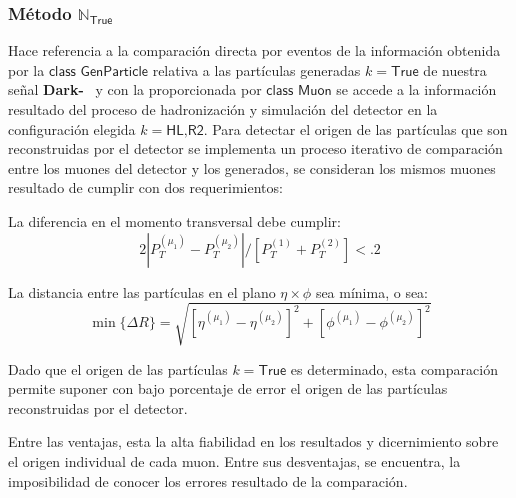 \subsubsection{Método $\mathbb{N}_\textsf{True}$}
Hace referencia a la comparación directa por eventos de la información obtenida por la  $\textsf{class GenParticle}$ relativa a las partículas generadas $k=\textsf{True}$ de nuestra señal \textbf{Dark-}\SUSY ~ y con la proporcionada por $\textsf{class Muon}$ se accede a la información resultado del proceso de hadronización y simulación del detector en la configuración elegida $k=\textsf{HL,R2}$. %
Para detectar el origen de las partículas que son reconstruidas por el detector se implementa un proceso iterativo de comparación entre los muones del detector y los generados, se consideran los mismos muones resultado de cumplir con dos requerimientos: 
\begin{itemize_f}
\item La diferencia en el momento transversal debe cumplir:
\begin{equation}
2\left|P_T^{(\mu_1)}-P_T^{(\mu_2)}\right|/\left[P_T^{(1)}+P_T^{(2)}\right] < .2
\end{equation} 
\item La distancia entre las partículas en el plano $\eta \times \phi$ sea mínima, o sea:
\begin{equation}
\min{\{\Delta R\}} = \sqrt{\left[\eta^{(\mu_1)} - \eta^{(\mu_2)}\right]^2 + \left[\phi^{(\mu_1)} - \phi^{(\mu_2)}\right]^2}
\end{equation}
\end{itemize_f} 
Dado que el origen de las partículas $k=\textsf{True}$ es determinado, esta comparación permite suponer con bajo porcentaje de error el origen de las partículas reconstruidas por el detector.

Entre las ventajas, esta la alta fiabilidad en los resultados y dicernimiento sobre el origen individual de cada muon. Entre sus desventajas, se encuentra, la imposibilidad de conocer los errores resultado de la comparación. %

